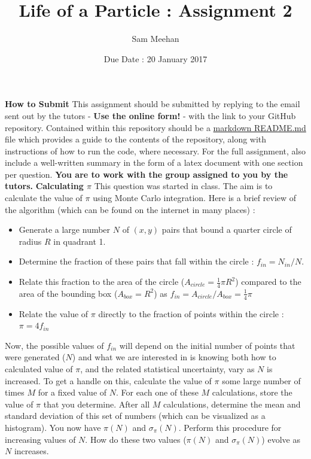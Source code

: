 \documentclass[12pt]{article}
\title{Life of a Particle : Assignment 2}
\author{Sam Meehan}
\date{Due Date : 20 January 2017}
\begin{document}
\maketitle

\textbf{How to Submit}
\newline
This assignment should be submitted by replying to the email sent out by the tutors - \textbf{Use the online form!} - with the link to your GitHub repository.  Contained within this repository should be a \href{https://github.com/adam-p/markdown-here/wiki/Markdown-Cheatsheet}{markdown README.md} file which provides a guide to the contents of the repository, along with instructions of how to run the code, where necessary.  For the full assignment, also include a well-written summary in the form of a latex document with one section per question.
\newline
\newline
\textbf{You are to work with the group assigned to you by the tutors.}
\newline
\newline
\textbf{Calculating $\pi$} 
\newline
\newline
This question was started in class.  The aim is to calculate the value of $\pi$ using Monte Carlo integration.  Here is a brief review of the algorithm (which can be found on the internet in many places) :
\begin{itemize}[noitemsep]
\item Generate a large number $N$ of $(x,y)$ pairs that bound a quarter circle of radius $R$ in quadrant 1.
\item Determine the fraction of these pairs that fall within the circle : $f_{in}=N_{in}/N$.
\item Relate this fraction to the area of the circle ($A_{circle}=\frac{1}{4}\pi R^2$) compared to the area of the bounding box ($A_{box}=R^2$) as $f_{in}=A_{circle}/A_{box}=\frac{1}{4}\pi$
\item Relate the value of $\pi$ directly to the fraction of points within the circle : $\pi=4f_{in}$
\end{itemize}
Now, the possible values of $f_{in}$ will depend on the initial number of points that were generated ($N$) and what we are interested in is knowing both how to calculated value of $\pi$, and the related statistical uncertainty, vary as $N$ is increased.
\newline
\newline
To get a handle on this, calculate the value of $\pi$ some large number of times $M$ for a fixed value of $N$.  For each one of these $M$ calculations, store the value of $\pi$ that you determine.  After all $M$ calculations, determine the mean and standard deviation of this set of numbers (which can be visualized as a histogram).  You now have $\pi(N)$ and $\sigma_{\pi}(N)$.  Perform this procedure for increasing values of $N$.  How do these two values ($\pi(N)$ and $\sigma_{\pi}(N)$) evolve as $N$ increases.
\end{document}
